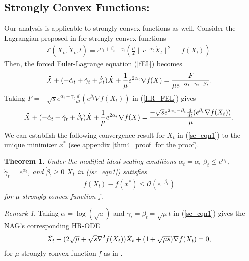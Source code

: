 \documentclass{article}
\theoremstyle{plain}
\newtheorem{theorem}{Theorem}[section]
\theoremstyle{definition}
\theoremstyle{remark}
\newtheorem{remark}{Remark}[theorem]
\begin{document}
\subsection{Strongly Convex Functions:} Our analysis is applicable to strongly convex functions as well. Consider the Lagrangian proposed in \citep{wilson2021lyapunov} for strongly convex functions
\begin{align}\label{strongly_cvx_lagrange}
    \mathcal{L}(X_t,\dot X_t,t)=e^{\alpha_t+\beta_t+\gamma_t}\left( \frac{\mu}{2}\|e^{-\alpha_t}\dot X_t\|^2-f(X_t)\right).
\end{align}
Then, the forced Euler-Lagrange equation (\ref{fEL}) becomes
\begin{align}\label{HR_FEL}
    \Ddot{X}+(-\dot \alpha_t + \dot 
 \gamma_t+ \dot \beta_t)\dot X+\frac{1}{\mu}e^{2\alpha_t}\nabla f(X)=\frac{F}{\mu e^{-\alpha_t + \gamma_t + \beta_t}}.
\end{align}
Taking \({F=-\sqrt{s}e^{\alpha_t+\gamma_t}\frac{d}{dt}(e^{\beta_t}\nabla f(X_t))}\) in (\ref{HR_FEL}) gives
\begin{align}\label{sc_eqn1}
    \Ddot{X}+(-\dot \alpha_t + \dot 
 \gamma_t+ \dot \beta_t)\dot X+\frac{1}{\mu}e^{2\alpha_t}\nabla f(X)=\frac{-\sqrt{s}e^{2\alpha_t-\beta_t}\frac{d}{dt}(e^{\beta_t}\nabla f(X_t))}{\mu }.
\end{align}
We can establish the following convergence result for \(X_t\) in (\ref{sc_eqn1}) to the unique minimizer \(x^*\) (see appendix \ref{thm4_proof} for the proof).
\begin{theorem}\label{Theorem3_1}
    Under the modified ideal scaling conditions \(\alpha_t=\alpha\), \(\dot \beta_t\leq e^{\alpha_t}\), \(\dot \gamma_t=e^{\alpha_t}\), and \(\dot \beta_t\geq 0\) \(X_t\) in (\ref{sc_eqn1}) satisfies
    \begin{align}\label{Theorem32_eqn1}
      f(X_t)-f(x^*)\leq \mathcal{O}(e^{-\beta_t})  
    \end{align}
    for \(\mu\)-strongly convex function \(f\).
\end{theorem}
\begin{remark}
    Taking \(\alpha=\log(\sqrt{\mu})\) and \(\gamma_t=\beta_t=\sqrt{\mu}t\) in (\ref{sc_eqn1}) gives the NAG's corresponding HR-ODE 
\begin{align}\label{high-res-ODE}
    \Ddot{X}_t+(2\sqrt{\mu}+\sqrt{s}\nabla^2 f(X_t))\dot X_t +(1+\sqrt{\mu s })\nabla f(X_t)=0,
\end{align}
for \(\mu\)-strongly convex function \(f\) as in \citep{Shi2021UnderstandingTA}.
\end{remark}
\end{document}
